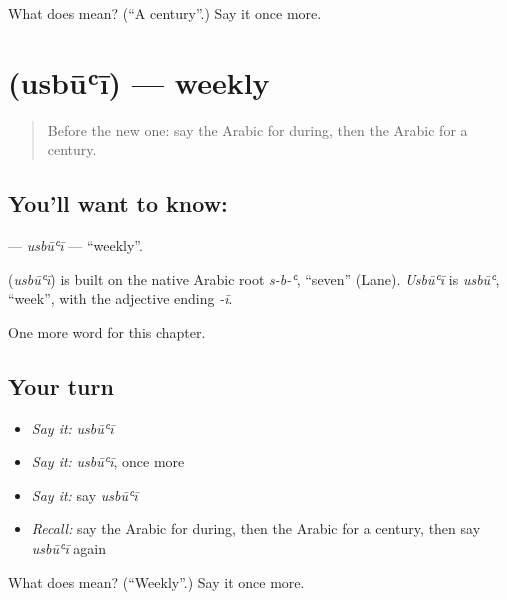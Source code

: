 \begin{tcolorbox}[breakable,colback=teal!4,colframe=teal!35!black,title={Before you move on}]
What does  mean? (\textquotedblleft{}A century\textquotedblright{}.) Say it once more.
\end{tcolorbox}
\section[\texorpdfstring{\ar{أسبوعي} (usbūʿī)}{أسبوعي (usbūʿī)}]{ (usbūʿī) — weekly}

\label{lesson:AR-C203-usbui}



\begin{quote}
Before the new one: say the Arabic for during, then the Arabic for a century.
\end{quote}

\subsection*{You'll want to know: }
\textbf{} — \emph{usbūʿī} — \textquotedblleft{}weekly\textquotedblright{}.

\begin{cousinweb}
\textbf{} (\emph{usbūʿī}) is built on the native Arabic root \emph{s-b-ʿ}, \textquotedblleft{}seven\textquotedblright{} (Lane). \emph{Usbūʿī} is \emph{usbūʿ}, \textquotedblleft{}week\textquotedblright{}, with the adjective ending \emph{-ī}.
\end{cousinweb}

\begin{grammarlens}[title={What you've built}]
One more word for this chapter.
\end{grammarlens}

\subsection*{Your turn}
\begin{itemize}
\raggedright
  \item \emph{Say it:} \emph{usbūʿī}
  \item \emph{Say it:} \emph{usbūʿī}, once more
  \item \emph{Say it:} say \emph{usbūʿī}
  \item \emph{Recall:} say the Arabic for during, then the Arabic for a century, then say \emph{usbūʿī} again
\end{itemize}

\begin{tcolorbox}[breakable,colback=teal!4,colframe=teal!35!black,title={Before you move on}]
What does  mean? (\textquotedblleft{}Weekly\textquotedblright{}.) Say it once more.
\end{tcolorbox}
